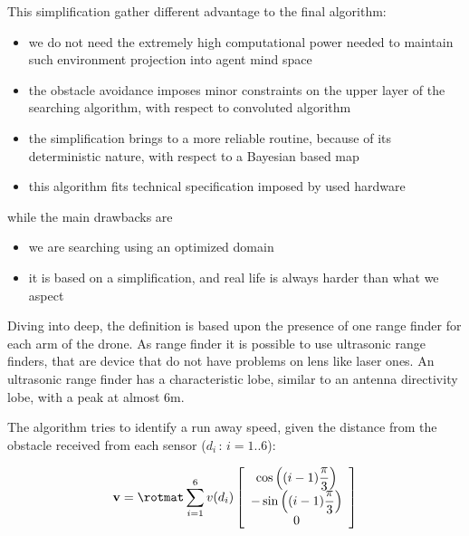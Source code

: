 This simplification gather different advantage to the final algorithm:
\begin{itemize}
\item we do not need the extremely high computational power needed to maintain such environment projection into agent mind space
\item the obstacle avoidance imposes minor constraints on the upper layer of the searching algorithm, with respect to convoluted algorithm
\item the simplification brings to a more reliable routine, because of its deterministic nature, with respect to a Bayesian based map
\item this algorithm fits technical specification imposed by used hardware
\end{itemize}
while the main drawbacks are
\begin{itemize}
\item we are searching using an optimized domain
\item it is based on a simplification, and real life is always harder than what we aspect
\end{itemize}

Diving into deep, the definition is based upon the presence of one range finder for each arm of the drone. As range finder it is possible to use ultrasonic range finders, that are device that do not have problems on lens like laser ones. An ultrasonic range finder has a characteristic lobe, similar to an antenna directivity lobe, with a peak at almost \num{6}\si{\meter}. 

The algorithm tries to identify a run away speed, given the distance from the obstacle received from each sensor (${d_i\,:\,i=1..6}$):

\begin{equation}
\mathbf{v} = \rotmat \sum\limits_{i=1}^{6}v(d_i)\vettore{\cos\braces{(i-1)\dfrac{\pi}{3}} \\ -\sin\braces{(i-1)\dfrac{\pi}{3}} \\0}
\end{equation}

